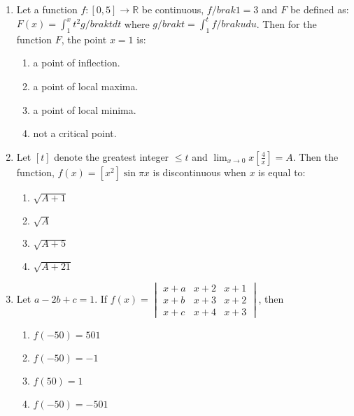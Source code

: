 \documentclass[journal]{IEEEtran}
\newcommand{\brak}[1]{\left( #1 \right)}
\newcommand{\sbrak}[1]{\left[ #1 \right]}
\begin{document}
\begin{enumerate}
    \item Let a function $ f: \sbrak{ 0, 5 } \rightarrow \mathbb{R} $ be continuous, $ f/brak{1} = 3 $ and $ F $ be defined as:
    $ F\brak{x} = \int_{1}^{x} t^{2} g/brak{t} dt $
    where
    $ g/brak{t} = \int_{1}^{t} f/brak{u} du $.
    Then for the function $ F $, the point $ x = 1 $ is:
    \begin{enumerate}
        \item a point of inflection.
        \item a point of local maxima.
        \item a point of local minima.
        \item not a critical point.
    \end{enumerate}

    \item Let $ [t] $ denote the greatest integer $ \leq t $ and
    $ \lim_{x \rightarrow 0} x \left[ \frac{4}{x} \right] = A $.
    Then the function, $ f\brak{x} = [x^{2}] \sin \pi x $ is discontinuous when $ x $ is equal to:
    \begin{enumerate}
        \item $ \sqrt{A+1} $
        \item $ \sqrt{A} $
        \item $ \sqrt{A+5} $
        \item $ \sqrt{A+21} $
    \end{enumerate}

    \item Let $ a - 2 b + c = 1 $.
    If $ f\brak{x} = 
    \begin{vmatrix}
    x + a & x + 2 & x + 1 \\
    x + b & x + 3 & x + 2 \\
    x + c & x + 4 & x + 3
    \end{vmatrix} $,
    then
    \begin{enumerate}
        \item $ f\brak{-50} = 501 $
        \item $ f\brak{-50} = -1 $
        \item $ f\brak{50} = 1 $
        \item $ f\brak{-50} = -501 $
    \end{enumerate}


\end{enumerate}
\end{document}
